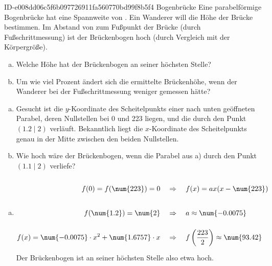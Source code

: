 \begin{exercise}
      {ID-e008dd06c5f6b097726911fa560770bd99f8b5f4}
      {Bogenbrücke}
  \ifproblem\problem
    Eine parabelförmige Bogenbrücke hat eine Spannweite von .
    Ein Wanderer will die Höhe der Brücke bestimmen. Im Abstand von
     zum Fußpunkt der Brücke (durch Fußschrittmessung) ist der
    Brückenbogen  hoch (durch Vergleich mit der Körpergröße).
    \begin{enumerate}[a)]
      \item Welche Höhe hat der Brückenbogen an seiner höchsten Stelle?
      \item Um wie viel Prozent ändert sich die ermittelte Brückenhöhe, wenn
            der Wanderer bei der Fußschrittmessung  weniger gemessen
            hätte?
    \end{enumerate}
  \fi
  \ifoutline\outline
    \begin{enumerate}[a)]
      \item Gesucht ist die $y$-Koordinate des Scheitelpunkts einer nach
            unten geöffneten Parabel, deren Nullstellen bei \num{0} und \num{223}
            liegen, und die durch den Punkt $(\num{1.2}\mid\num{2})$ verläuft.
            Bekanntlich liegt die $x$-Koordinate des Scheitelpunkts genau in
            der Mitte zwischen den beiden Nullstellen.
      \item Wie hoch wäre der Brückenbogen, wenn die Parabel aus a) durch den Punkt
            $(\num{1.1}\mid\num{2})$ verliefe?
    \end{enumerate}
  \fi
  \ifoutcome\outcome
    \begin{enumerate}[a)]
      \newcommand{\vstrut}{\rule[-2.75ex]{0pt}{7ex}}%
      \setlength{\abovedisplayskip}{0pt}%
      \item \begin{equation*}
                \begin{split}
                                            f(0)=f(\num{223})=0 \quad&\vstrut\Rightarrow\quad f(x)=ax(x-\num{223})  \\
                                           f(\num{1.2})=\num{2} \quad&\vstrut\Rightarrow\quad a\approx\num{-0.0075} \\
                f(x)=\num{-0.0075}\cdot x^2+\num{1.6757}\cdot x \quad&\vstrut\Rightarrow\quad f\left(\frac{223}{2}\right)\approx\num{93.42}
              \end{split}
            \end{equation*}
            Der Brückenbogen ist an seiner höchsten Stelle also etwa  hoch.


\end{enumerate}
\end{exercise}
